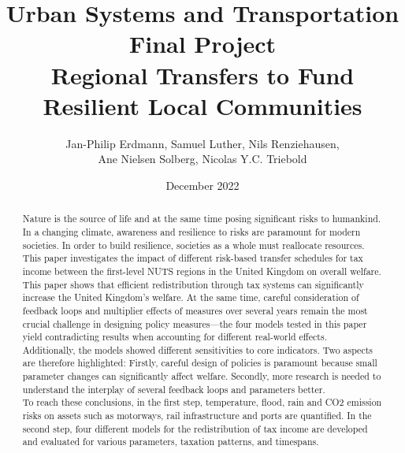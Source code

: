 \documentclass[10pt,a4paper]{article}
\title{\vspace{.0cm}Urban Systems and Transportation \\ Final Project \vspace{5.5cm}\\ \textbf{Regional Transfers to Fund Resilient Local Communities}\vspace{3.5 cm}}
\author{Jan-Philip Erdmann, Samuel Luther, Nils Renziehausen, \\Ane Nielsen Solberg, Nicolas Y.C. Triebold\vspace{1cm}}
\date{December 2022}
\begin{document}
\maketitle
\newpage
{}


\begin{abstract}
Nature is the source of life and at the same time posing significant risks to humankind. In a changing climate, awareness and resilience to risks are paramount for modern societies. In order to build resilience, societies as a whole must reallocate resources. This paper investigates the impact of different risk-based transfer schedules for tax income between the first-level NUTS regions in the United Kingdom on overall welfare.
\\
This paper shows that efficient redistribution through tax systems can significantly increase the United Kingdom's welfare. At the same time, careful consideration of feedback loops and multiplier effects of measures over several years remain the most crucial challenge in designing policy measures—the four models tested in this paper yield contradicting results when accounting for different real-world effects. Additionally, the models showed different sensitivities to core indicators. Two aspects are therefore highlighted: Firstly, careful design of policies is paramount because small parameter changes can significantly affect welfare. Secondly, more research is needed to understand the interplay of several feedback loops and parameters better.
\\
To reach these conclusions, in the first step, temperature, flood, rain and CO2 emission risks on assets such as motorways, rail infrastructure and ports are quantified. In the second step, four different models for the redistribution of tax income are developed and evaluated for various parameters, taxation patterns, and timespans.
\end{abstract}
\newpage
\tableofcontents
\newpage
\end{document}
